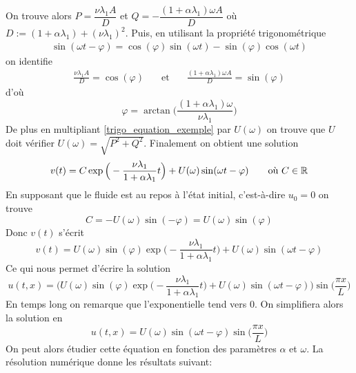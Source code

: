 On trouve alors $P = \dfrac{\nu \lambda_1 A}{D}$ et $Q= - \dfrac{(1 + \alpha \lambda_1)\omega A}{D}$ où $D := (1+\alpha \lambda_1) + (\nu \lambda_1)^2$.
Puis, en utilisant la propriété trigonométrique
\begin{eqnarray} \label{trigo_equation_exemple}
    \sin(\omega t - \varphi) = \cos(\varphi)\sin(\omega t) - \sin(\varphi)\cos(\omega t)
\end{eqnarray}
on identifie 
\begin{eqnarray*}
    \frac{\nu \lambda_1 A}{D} = \cos(\varphi) \ \ \  &\text{ et }& \ \ \ \frac{(1 + \alpha \lambda_1)\omega A}{D}= \sin(\varphi)
\end{eqnarray*}
d'où 
\begin{equation*}
    \varphi= \arctan \bigg(\frac{(1+\alpha \lambda_1) \omega}{\nu \lambda_1}\bigg)
\end{equation*}
De plus en multipliant \eqref{trigo_equation_exemple} par $U(\omega)$ on trouve que $U$ doit vérifier $U(\omega) = \sqrt{P^2 + Q^2}$. Finalement on obtient une solution 
\begin{equation*}
    v(t) = C \exp{\Big(-\frac{\nu \lambda_1}{1+ \alpha \lambda_1}t\Big)} + U(\omega)\sin(\omega t-\varphi) \ \ \ \ \ \text{ où } C \in \mathbb{R}
\end{equation*}
En supposant que le fluide est au repos à l'état initial, c'est-à-dire $u_0 = 0$ on trouve 
\begin{equation*}
    C = -U(\omega) \sin(-\varphi) = U(\omega) \sin(\varphi)
\end{equation*}
Donc $v(t)$ s'écrit
\begin{equation*}
    v(t) = U(\omega) \sin(\varphi) \exp{\Big(-\frac{\nu \lambda_1}{1+ \alpha \lambda_1}t\Big)} + U(\omega)\sin(\omega t-\varphi)
\end{equation*}
Ce qui nous permet d'écrire la solution
\begin{equation*}
    u(t,x) = \bigg(U(\omega) \sin(\varphi) \exp{\Big(-\frac{\nu \lambda_1}{1+ \alpha \lambda_1}t\Big)} + U(\omega)\sin(\omega t-\varphi) \bigg) \sin\Big(\frac{\pi x}{L}\Big)
\end{equation*}
En temps long on remarque que l'exponentielle tend vers $0$. On simplifiera alors la solution en 
\begin{equation*}
    u(t,x) = U(\omega)\sin(\omega t-\varphi)  \sin\Big(\frac{\pi x}{L}\Big)
\end{equation*}
On peut alors étudier cette équation en fonction des paramètres $\alpha$ et $\omega$. La résolution numérique donne les résultats suivant:
